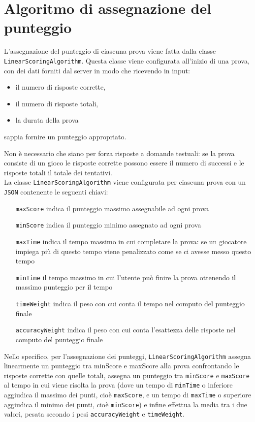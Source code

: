 \section{Algoritmo di assegnazione del punteggio}
\label{sec:Algoritmo di assegnazione del punteggio}

L'assegnazione del punteggio di ciascuna prova viene fatta dalla classe \texttt{LinearScoringAlgorithm}. Questa classe viene configurata all'inizio di una prova, con dei dati forniti dal server in modo che ricevendo in input:
\begin{itemize}
   \item il numero di risposte corrette,
   \item il numero di risposte totali,
   \item la durata della prova
\end{itemize}
sappia fornire un punteggio appropriato.

Non è necessario che siano per forza risposte a domande testuali: se la prova consiste di un gioco le risposte corrette possono essere il numero di successi e le risposte totali il totale dei tentativi. \\

La classe \texttt{LinearScoringAlgorithm} viene configurata per ciascuna prova con un \texttt{JSON} contenente le seguenti chiavi:
\begin{itemize}
   \item[\texttt{maxScore}] indica il punteggio massimo assegnabile ad ogni prova
   \item[\texttt{minScore}] indica il punteggio minimo assegnato ad ogni prova
   \item[\texttt{maxTime}] indica il tempo massimo in cui completare la prova: se un giocatore impiega più di questo tempo viene penalizzato come se ci avesse messo questo tempo
   \item[\texttt{minTime}] il tempo massimo in cui l'utente può finire la prova ottenendo il massimo punteggio per il tempo
   \item[\texttt{timeWeight}] indica il peso con cui conta il tempo nel computo del punteggio finale
   \item[\texttt{accuracyWeight}] indica il peso con cui conta l'esattezza delle risposte nel computo del punteggio finale
\end{itemize}

Nello specifico, per l'assegnazione dei punteggi, \texttt{LinearScoringAlgorithm} assegna linearmente un punteggio tra minScore e maxScore alla prova confrontando le risposte corrette con quelle totali, assegna un punteggio tra \texttt{minScore} e \texttt{maxScore} al tempo in cui viene risolta la prova (dove un tempo di \texttt{minTime} o inferiore aggiudica il massimo dei punti, cioè \texttt{maxScore}, e un tempo di \texttt{maxTime} o superiore aggiudica il minimo dei punti, cioè \texttt{minScore}) e infine effettua la media tra i due valori, pesata secondo i pesi \texttt{accuracyWeight} e \texttt{timeWeight}.

